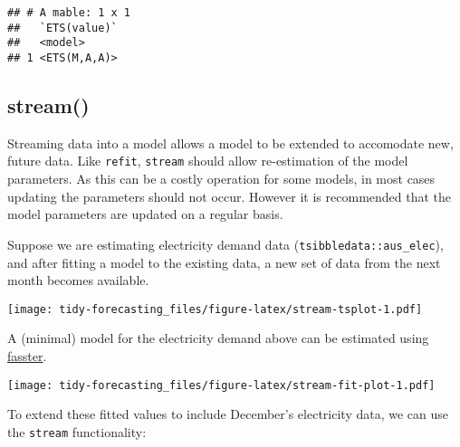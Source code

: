 \documentclass[]{book}
\newenvironment{Shaded}{\begin{snugshade}}{\end{snugshade}}
\newcommand{\DataTypeTok}[1]{\textcolor[rgb]{0.13,0.29,0.53}{#1}}
\newcommand{\DecValTok}[1]{\textcolor[rgb]{0.00,0.00,0.81}{#1}}
\newcommand{\KeywordTok}[1]{\textcolor[rgb]{0.13,0.29,0.53}{\textbf{#1}}}
\newcommand{\NormalTok}[1]{#1}
\newcommand{\OperatorTok}[1]{\textcolor[rgb]{0.81,0.36,0.00}{\textbf{#1}}}
\newcommand{\StringTok}[1]{\textcolor[rgb]{0.31,0.60,0.02}{#1}}
\begin{document}
\begin{verbatim}
## # A mable: 1 x 1
##   `ETS(value)`
##   <model>     
## 1 <ETS(M,A,A)>
\end{verbatim}

\hypertarget{stream}{%
\subsection{stream()}\label{stream}}

Streaming data into a model allows a model to be extended to accomodate new, future data. Like \texttt{refit}, \texttt{stream} should allow re-estimation of the model parameters. As this can be a costly operation for some models, in most cases updating the parameters should not occur. However it is recommended that the model parameters are updated on a regular basis.

Suppose we are estimating electricity demand data (\texttt{tsibbledata::aus\_elec}), and after fitting a model to the existing data, a new set of data from the next month becomes available.

\texttt{[image: tidy-forecasting\_files/figure-latex/stream-tsplot-1.pdf]}

A (minimal) model for the electricity demand above can be estimated using \href{https://github.com/tidyverts/fasster}{fasster}.

\begin{Shaded}
\end{Shaded}

\texttt{[image: tidy-forecasting\_files/figure-latex/stream-fit-plot-1.pdf]}

To extend these fitted values to include December's electricity data, we can use the \texttt{stream} functionality:

\begin{Shaded}
\end{Shaded}
\end{document}
